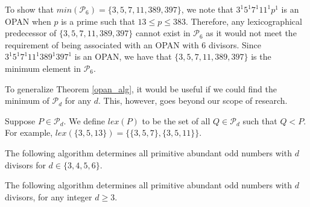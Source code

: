 \documentclass[../paper.tex]{subfiles}
\begin{document}
To show that $min(\mathcal{P}_6) = \{3, 5, 7, 11, 389, 397\}$, we
note that $3^1 5^1 7^1 11^1 p^1$ is an OPAN when $p$ is a prime
such that $13 \leq p \leq 383$. Therefore, any lexicographical
predecessor of $\{3, 5, 7, 11, 389, 397\}$ cannot exist in
$\mathcal{P}_6$ as it would not meet the requirement of being
associated with an OPAN with 6 divisors. Since $3^1 5^1 7^1 11^1 
389^1 397^1$ is an OPAN, we have that $\{3, 5, 7, 11, 389, 397\}$
is the minimum element in $\mathcal{P}_6$.

To generalize Theorem {\ref{opan_alg}}, it would be useful if we
could find the minimum of $\mathcal{P}_d$ for any $d$. This,
however, goes beyond our scope of research.

Suppose $P \in \mathcal{P}_d$. We define $lex(P)$ to be the set
of all $Q \in \mathcal{P}_d$ such that $Q < P$. For example,  
$lex(\{3,5,13\}) = \{\{3, 5, 7\}, \{3, 5, 11\}\}$.

\begin{theorem} \label{opan_alg}
The following algorithm determines all primitive
abundant odd numbers with $d$ divisors for $d \in \{3,4,5,6\}$.
\end{theorem}

\begin{conj}
The following algorithm determines all primitive
abundant odd numbers with $d$ divisors, for any integer $d \geq 3$.
\end{conj}
\end{document}
